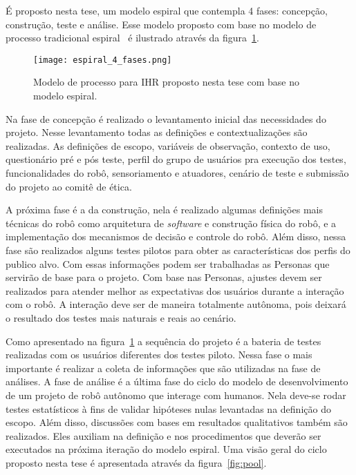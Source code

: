É proposto nesta tese, um modelo espiral que contempla 4 fases: concepção, construção, teste e análise. Esse modelo proposto com base no modelo de processo tradicional espiral~\cite{sommerville:2008} é ilustrado através da figura~\ref{fig:espiral}.

\begin{figure}[ht!]
	\centering
	\begin{minipage}{0.7\textwidth}
		\caption{Modelo de processo para IHR proposto nesta tese com base no modelo espiral.}
		\texttt{[image: espiral\_4\_fases.png]}
		\label{fig:espiral}
	\end{minipage}
\end{figure}

Na fase de concepção é realizado o levantamento inicial das necessidades do projeto. Nesse levantamento todas as definições e contextualizações são realizadas. As definições de escopo, variáveis de observação, contexto de uso, questionário pré e pós teste, perfil do grupo de usuários pra execução dos testes, funcionalidades do robô, sensoriamento e atuadores, cenário de teste e submissão do projeto ao comitê de ética. 

A próxima fase é a da construção, nela é realizado algumas definições mais técnicas do robô como arquitetura de \textit{software} e construção física do robô, e a implementação dos mecanismos de decisão e controle do robô. Além disso, nessa fase são realizados alguns testes pilotos para obter as características dos perfis do publico alvo. Com essas informações podem ser trabalhadas as Personas que servirão de base para o projeto. Com base nas Personas, ajustes devem ser realizados para atender melhor as expectativas dos usuários durante a interação com o robô. A interação deve ser de maneira totalmente autônoma, pois deixará o resultado dos testes mais naturais e reais ao cenário.

Como apresentado na figura~\ref{fig:espiral} a sequência do projeto é a bateria de testes realizadas com os usuários diferentes dos testes piloto. Nessa fase o mais importante é realizar a coleta de informações que são utilizadas na fase de análises. A fase de análise é a última fase do ciclo do modelo de desenvolvimento de um projeto de robô autônomo que interage com humanos. Nela deve-se rodar testes estatísticos à fins de validar hipóteses nulas levantadas na definição do escopo. Além disso, discussões com bases em resultados qualitativos também são realizados. Eles auxiliam na definição e nos procedimentos que deverão ser executados na próxima iteração do modelo espiral. Uma visão geral do ciclo proposto nesta tese é apresentada através da figura~\ref{fig:pool}.


